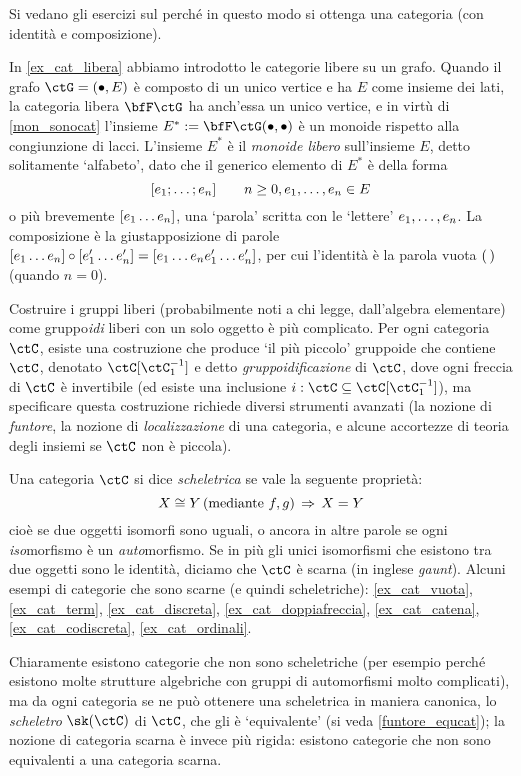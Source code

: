Si vedano gli esercizi sul perché in questo modo si ottenga una categoria (con identità e composizione).
\begin{example}\label{mongruppi_liberi}
	In \ref{ex_cat_libera} abbiamo introdotto le categorie libere su un grafo. Quando il grafo \(\ctG=(\bullet,E)\) è composto di un unico vertice e ha \(E\) come insieme dei lati, la categoria libera \(\bfF\ctG\) ha anch'essa un unico vertice, e in virtù di \ref{mon_sonocat} l'insieme \(E^* := \bfF\ctG(\bullet,\bullet)\) è un monoide rispetto alla congiunzione di lacci. L'insieme \(E^*\) è il \emph{monoide libero} sull'insieme \(E\), detto solitamente `alfabeto', dato che il generico elemento di \(E^*\) è della forma
	\[[\tup en;]\qquad n\ge 0, \tup en,\in E\]
	o più brevemente \([\tup en{}]\), una `parola' scritta con le `lettere' \(\tup en,\). La composizione è la giustapposizione di parole \([\tup en{}]\cmp[\tup {e'}n{}] = [\tup en{}\tup{e'}n{}]\), per cui l'identità è la parola vuota \((\,)\) (quando \(n=0\)).

	Costruire i gruppi liberi (probabilmente noti a chi legge, dall'algebra elementare) come gruppo\emph{idi} liberi con un solo oggetto è più complicato. Per ogni categoria \(\ctC\), esiste una costruzione che produce `il più piccolo' gruppoide che contiene \(\ctC\), denotato \(\ctC[\ctC_1^{-1}]\) e detto \emph{gruppoidificazione} di \(\ctC\), dove ogni freccia di \(\ctC\) è invertibile (ed esiste una inclusione \(i : \ctC\subseteq \ctC[\ctC_1^{-1}]\)), ma specificare questa costruzione richiede diversi strumenti avanzati (la nozione di \emph{funtore}, la nozione di \emph{localizzazione} di una categoria, e alcune accortezze di teoria degli insiemi se \(\ctC\) non è piccola).
\end{example}
\begin{definition}\label{def_cat_scheletrica}
	Una categoria \(\ctC\) si dice \emph{scheletrica} se vale la seguente proprietà:
	\[X\cong Y \, (\text{mediante } f,g) \,\Rightarrow\, X=Y\]
	cioè se due oggetti isomorfi sono uguali, o ancora in altre parole se ogni \emph{iso}morfismo è un \emph{auto}morfismo. Se in più gli unici isomorfismi che esistono tra due oggetti sono le identità, diciamo che \(\ctC\) è scarna (in inglese \emph{gaunt}). Alcuni esempi di categorie che sono scarne (e quindi scheletriche): \ref{ex_cat_vuota}, \ref{ex_cat_term}, \ref{ex_cat_discreta}, \ref{ex_cat_doppiafreccia}, \ref{ex_cat_catena}, \ref{ex_cat_codiscreta}, \ref{ex_cat_ordinali}.
\end{definition}
Chiaramente esistono categorie che non sono scheletriche (per esempio perché esistono molte strutture algebriche con gruppi di automorfismi molto complicati), ma da ogni categoria se ne può ottenere una scheletrica in maniera canonica, lo \emph{scheletro} \(\sk(\ctC)\) di \(\ctC\), che gli è `equivalente' (si veda \ref{funtore_equcat}); la nozione di categoria scarna è invece più rigida: esistono categorie che non sono equivalenti a una categoria scarna.

